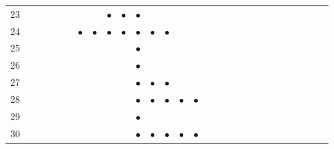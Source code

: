 \documentclass[text.tex]{subfiles}
\begin{document}
\begin{table}
{\begin{tabular}{l|ccccccccccccccccccccccccccc}
23  &           &           &           &           &           &           &           & $\bullet$ & $\bullet$ & $\bullet$ &           &           &           &           &           &           &           &           &           &           &           &           &           &           &           &           &           \\
24  &           &           &           &           &           & $\bullet$ & $\bullet$ & $\bullet$ & $\bullet$ & $\bullet$ & $\bullet$ & $\bullet$ &           &           &           &           &           &           &           &           &           &           &           &           &           &           &           \\
25  &           &           &           &           &           &           &           &           &           & $\bullet$ &           &           &           &           &           &           &           &           &           &           &           &           &           &           &           &           &           \\
26  &           &           &           &           &           &           &           &           &           & $\bullet$ &           &           &           &           &           &           &           &           &           &           &           &           &           &           &           &           &           \\
27  &           &           &           &           &           &           &           &           &           & $\bullet$ & $\bullet$ & $\bullet$ &           &           &           &           &           &           &           &           &           &           &           &           &           &           &           \\
28  &           &           &           &           &           &           &           &           &           & $\bullet$ & $\bullet$ & $\bullet$ & $\bullet$ & $\bullet$ &           &           &           &           &           &           &           &           &           &           &           &           &           \\
29  &           &           &           &           &           &           &           &           &           & $\bullet$ &           &           &           &           &           &           &           &           &           &           &           &           &           &           &           &           &           \\
30  &           &           &           &           &           &           &           &           &           & $\bullet$ & $\bullet$ & $\bullet$ & $\bullet$ & $\bullet$ &           &           &           &           &           &           &           &           &           &           &           &           &           \\

\end{tabular}}
\end{table}
\end{document}
